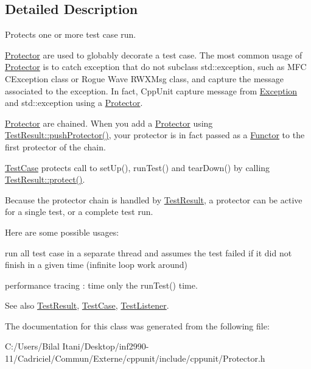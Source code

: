 \subsection{Detailed Description}
Protects one or more test case run. 

\hyperlink{class_protector}{Protector} are used to globably \textquotesingle{}decorate\textquotesingle{} a test case. The most common usage of \hyperlink{class_protector}{Protector} is to catch exception that do not subclass std\+::exception, such as M\+FC C\+Exception class or Rogue Wave R\+W\+X\+Msg class, and capture the message associated to the exception. In fact, Cpp\+Unit capture message from \hyperlink{class_exception}{Exception} and std\+::exception using a \hyperlink{class_protector}{Protector}.

\hyperlink{class_protector}{Protector} are chained. When you add a \hyperlink{class_protector}{Protector} using \hyperlink{class_test_result_a1a4fbbca38cb73e8e00905193b7593dc}{Test\+Result\+::push\+Protector()}, your protector is in fact passed as a \hyperlink{class_functor}{Functor} to the first protector of the chain.

\hyperlink{class_test_case}{Test\+Case} protects call to set\+Up(), run\+Test() and tear\+Down() by calling \hyperlink{class_test_result_a243b3097a3d9468abc61e7910bbaa8b7}{Test\+Result\+::protect()}.

Because the protector chain is handled by \hyperlink{class_test_result}{Test\+Result}, a protector can be active for a single test, or a complete test run.

Here are some possible usages\+:
\begin{DoxyItemize}
\item run all test case in a separate thread and assumes the test failed if it did not finish in a given time (infinite loop work around)
\item performance tracing \+: time only the run\+Test() time. \begin{DoxySeeAlso}{See also}
\hyperlink{class_test_result}{Test\+Result}, \hyperlink{class_test_case}{Test\+Case}, \hyperlink{class_test_listener}{Test\+Listener}. 
\end{DoxySeeAlso}

\end{DoxyItemize}

The documentation for this class was generated from the following file\+:\begin{DoxyCompactItemize}
\item 
C\+:/\+Users/\+Bilal Itani/\+Desktop/inf2990-\/11/\+Cadriciel/\+Commun/\+Externe/cppunit/include/cppunit/Protector.\+h\end{DoxyCompactItemize}
